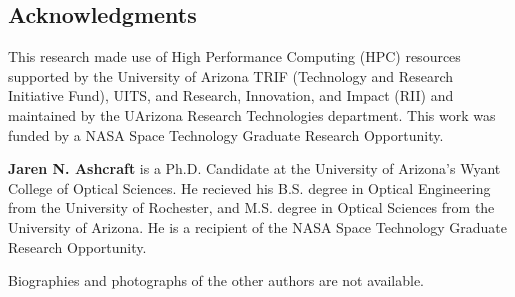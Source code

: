 \documentclass[12pt]{spieman}  %
\begin{document}
\begin{spacing}{2}   %












\section{Acknowledgments}
This research made use of High Performance Computing (HPC) resources supported by the University of Arizona TRIF (Technology and Research Initiative Fund), UITS, and Research, Innovation, and Impact (RII) and maintained by the UArizona Research Technologies department. This work was funded by a NASA Space Technology Graduate Research Opportunity.

\vspace{2ex}\noindent\textbf{Jaren N. Ashcraft} is a Ph.D. Candidate at the University of Arizona's Wyant College of Optical Sciences. He recieved his B.S. degree in Optical Engineering from the University of Rochester, and M.S. degree in Optical Sciences from the University of Arizona. He is a recipient of the NASA Space Technology Graduate Research Opportunity.

\vspace{1ex}
\noindent Biographies and photographs of the other authors are not available.

\listoffigures
\listoftables

\end{spacing}
\end{document}
